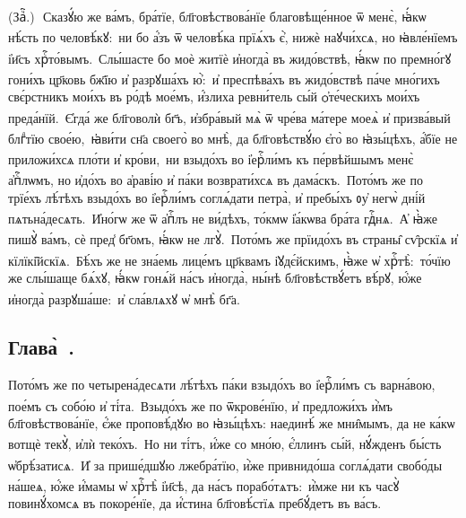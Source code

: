 (Заⷱ҇\:.)~\textsuperscript{}\,Сказꙋ́ю же ва́мъ, бра́тїе, бл҃говѣствова́нїе благовѣще́нное ѿ менє̀, ꙗ҆́кѡ нѣ́сть по человѣ́кꙋ: \textsuperscript{}\,ни бо а҆́зъ ѿ человѣ́ка прїѧ́хъ є҆̀, нижѐ наꙋчи́хсѧ, но ꙗ҆вле́нїемъ і҆и҃съ хрⷭ҇то́вымъ. \textsuperscript{}\,Слы́шасте бо моѐ житїѐ и҆ногда̀ въ жидо́вствѣ, ꙗ҆́кѡ по премно́гꙋ гони́хъ цр҃ковь бж҃їю и҆ разрꙋша́хъ ю҆̀: \textsuperscript{}\,и҆ преспѣва́хъ въ жидо́вствѣ па́че мно́гихъ свє́рстникъ мои́хъ въ ро́дѣ мое́мъ, и҆́злиха ревни́тель сы́й ѻ҆те́ческихъ мои́хъ преда́нїй. \textsuperscript{}\,Є҆гда́ же бл҃говолѝ бг҃ъ, и҆збра́вый мѧ̀ ѿ чре́ва ма́тере моеѧ̀ и҆ призва́вый блгⷣтїю свое́ю, \textsuperscript{}\,ꙗ҆ви́ти сн҃а своего̀ во мнѣ̀, да бл҃говѣствꙋ́ю є҆го̀ во ꙗ҆зы́цѣхъ, а҆́бїе не приложи́хсѧ пло́ти и҆ кро́ви, \textsuperscript{}\,ни взыдо́хъ во і҆ерⷭ҇ли́мъ къ пе́рвѣйшымъ менє̀ а҆пⷭ҇лѡмъ, но и҆до́хъ во а҆раві́ю и҆ па́ки возврати́хсѧ въ дама́скъ. \textsuperscript{}\,Пото́мъ же по трїе́хъ лѣ́тѣхъ взыдо́хъ во і҆ерⷭ҇ли́мъ соглѧ́дати петра̀, и҆ пребы́хъ ᲂу҆ негѡ̀ дні́й пѧтьна́десѧть. \textsuperscript{}\,И҆но́гѡ же ѿ а҆пⷭ҇лъ не ви́дѣхъ, то́кмѡ і҆а́кѡва бра́та гдⷭ҇нѧ. \textsuperscript{}\,А҆ ꙗ҆̀же пишꙋ̀ ва́мъ, сѐ пред̾ бг҃омъ, ꙗ҆́кѡ не лгꙋ̀. \textsuperscript{}\,Пото́мъ же прїидо́хъ въ страны̑ сѵ̑рскїѧ и҆ кїлїкі̑йскїѧ. \textsuperscript{}\,Бѣ́хъ же не зна́емь лице́мъ цр҃квамъ і҆ꙋдє́йскимъ, ꙗ҆̀же ѡ҆ хрⷭ҇тѣ̀: \textsuperscript{}\,то́чїю же слы́шаще бѧ́хꙋ, ꙗ҆́кѡ гонѧ́й на́съ и҆ногда̀, ны́нѣ бл҃говѣствꙋ́етъ вѣ́рꙋ, ю҆́же и҆ногда̀ разрꙋша́ше: \textsuperscript{}\,и҆ сла́влѧхꙋ ѡ҆ мнѣ̀ бг҃а.

\subsection{Глава̀~.}

\cuLettrine Пото́мъ же по четырена́десѧти лѣ́тѣхъ па́ки взыдо́хъ во і҆ерⷭ҇ли́мъ съ варна́вою, пое́мъ съ собо́ю и҆ ті́та. \textsuperscript{}\,Взыдо́хъ же по ѿкрове́нїю, и҆ предложи́хъ и҆̀мъ бл҃говѣствова́нїе, є҆́же проповѣ́дꙋю во ꙗ҆зы́цѣхъ: наединѣ́ же мни̑мымъ, да не ка́кѡ вотщѐ текꙋ̀, и҆лѝ теко́хъ. \textsuperscript{}\,Но ни ті́тъ, и҆́же со мно́ю, є҆́ллинъ сы́й, нꙋ́жденъ бы́сть ѡ҆брѣ́затисѧ. \textsuperscript{}\,И҆ за прише́дшꙋю лжебра́тїю, и҆̀же привнидо́ша соглѧ́дати свобо́ды на́шеѧ, ю҆́же и҆́мамы ѡ҆ хрⷭ҇тѣ̀ і҆и҃сѣ, да на́съ порабо́тѧтъ: \textsuperscript{}\,и҆̀мже ни къ часꙋ̀ повинꙋ́хомсѧ въ покоре́нїе, да и҆́стина бл҃говѣ́стїѧ пребꙋ́детъ въ ва́съ.

